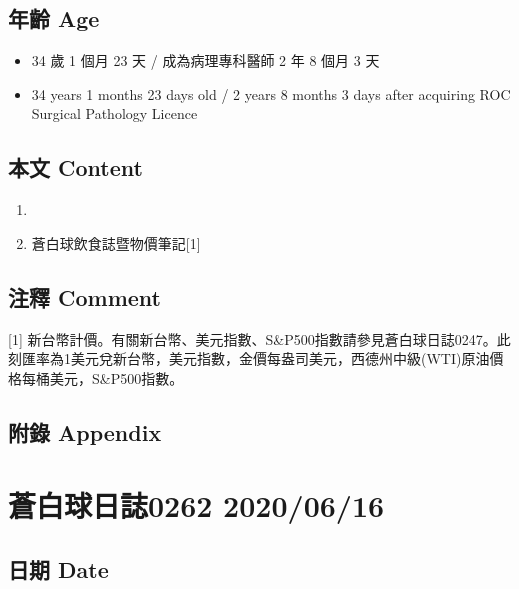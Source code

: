 \documentclass[a5paper, 11pt
]{book}
\providecommand{\tightlist}{%
  \setlength{\itemsep}{0pt}\setlength{\parskip}{0pt}}
\begin{document}
\hypertarget{ux5e74ux9f61-age-14}{%
\subsection{年齡 Age}\label{ux5e74ux9f61-age-14}}

\begin{itemize}
\tightlist
\item
  34 歲 1 個月 23 天 / 成為病理專科醫師 2 年 8 個月 3 天
\item
  34 years 1 months 23 days old / 2 years 8 months 3 days after
  acquiring ROC Surgical Pathology Licence
\end{itemize}

\hypertarget{ux672cux6587-content-14}{%
\subsection{本文 Content}\label{ux672cux6587-content-14}}

\begin{enumerate}
\def\labelenumi{\arabic{enumi}.}
\tightlist
\item
\item
  蒼白球飲食誌暨物價筆記{[}1{]}
\end{enumerate}

\hypertarget{ux6ce8ux91cb-comment-14}{%
\subsection{注釋 Comment}\label{ux6ce8ux91cb-comment-14}}

{[}1{]}
新台幣計價。有關新台幣、美元指數、S\&P500指數請參見蒼白球日誌0247。此刻匯率為1美元兌新台幣，美元指數，金價每盎司美元，西德州中級(WTI)原油價格每桶美元，S\&P500指數。

\hypertarget{ux9644ux9304-appendix-14}{%
\subsection{附錄 Appendix}\label{ux9644ux9304-appendix-14}}

\hypertarget{ux84bcux767dux7403ux65e5ux8a8c0262-20200616}{%
\section{蒼白球日誌0262
2020/06/16}\label{ux84bcux767dux7403ux65e5ux8a8c0262-20200616}}

\hypertarget{ux65e5ux671f-date-15}{%
\subsection{日期 Date}\label{ux65e5ux671f-date-15}}
\end{document}
